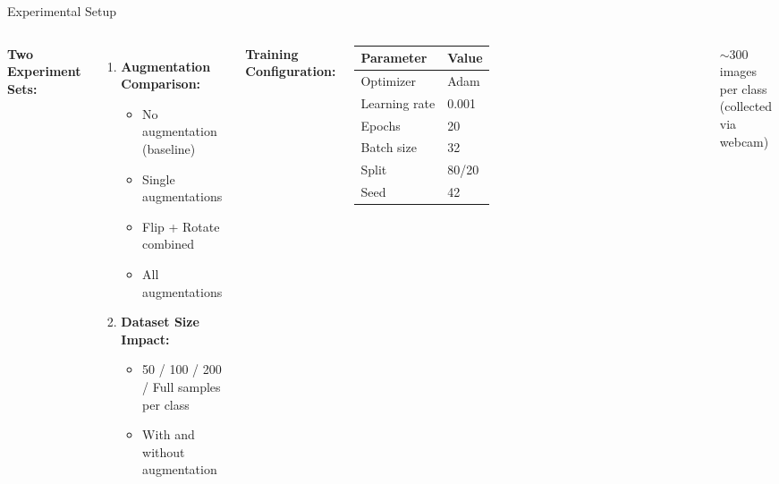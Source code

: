 \documentclass[aspectratio=169, 10pt]{beamer}
\begin{document}
\begin{frame}{Experimental Setup}
    \begin{columns}[T, onlytextwidth]
            \textbf{Two Experiment Sets:}
            \begin{enumerate}
                \item \textbf{Augmentation Comparison:}
                \begin{itemize}
                    \item No augmentation (baseline)
                    \item Single augmentations
                    \item Flip + Rotate combined
                    \item All augmentations
                \end{itemize}
                \vspace{0.2cm}
                \item \textbf{Dataset Size Impact:}
                \begin{itemize}
                    \item 50 / 100 / 200 / Full samples per class
                    \item With and without augmentation
                \end{itemize}
            \end{enumerate}

            \textbf{Training Configuration:}
            \begin{table}
                \centering
                \begin{tabular}{ll}
                    \toprule
                    Parameter & Value \\
                    \midrule
                    Optimizer & Adam \\
                    Learning rate & 0.001 \\
                    Epochs & 20 \\
                    Batch size & 32 \\
                    Split & 80/20 \\
                    Seed & 42 \\
                    \bottomrule
                \end{tabular}
            \end{table}
            \small
            $\sim$300 images per class\\ (collected via webcam)
    \end{columns}
\end{frame}
\end{document}
